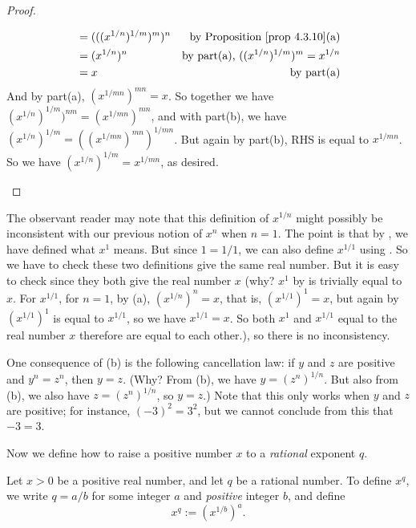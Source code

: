 \begin{proof}
\begin{enumerate}
\begin{align*}
                               & = (((x^{1/n})^{1/m})^m)^n & \text{by \PROP{4.3.10}(a)} \\
                               & = (x^{1/n})^n & \text{by part(a), \(((x^{1/n})^{1/m})^m = x^{1/n}\)} \\
                               & = x & \text{by part(a)}
    \end{align*}
    And by part(a), \((x^{1/mn})^{mn} = x\).
    So together we have \((x^{1/n})^{1/m})^{nm} = (x^{1/mn})^{mn}\),
    and with part(b), we have \((x^{1/n})^{1/m} = ((x^{1/mn})^{mn})^{1/mn}\).
    But again by part(b), RHS is equal to \(x^{1/mn}\).
    So we have \((x^{1/n})^{1/m} = x^{1/mn}\), as desired.
\end{enumerate}
\end{proof}

\begin{note}
The observant reader may note that this definition of \(x^{1/n}\) might possibly be inconsistent with our previous notion of \(x^n\) when \(n = 1\).
The point is that by , we have defined what \(x^1\) means.
But since \(1 = 1/1\), we can also define \(x^{1/1}\) using .
So we have to check these two definitions give the same real number.
But it is easy to check since they both give the real number \(x\)
(why? \(x^1\) by  is trivially equal to \(x\).
For \(x^{1/1}\), for \(n = 1\), by (a), \((x^{1/n})^n = x\), that is, \((x^{1/1})^1 = x\), but again by  \((x^{1/1})^1\) is equal to \(x^{1/1}\), so we have \(x^{1/1} = x\).
So both \(x^1\) and \(x^{1/1}\) equal to the real number \(x\) therefore are equal to each other.),
so there is no inconsistency.
\end{note}

\begin{note}
One consequence of (b) is the following cancellation law:
if \(y\) and \(z\) are positive and \(y^n = z^n\), then \(y = z\). (Why? From (b), we have \(y = (z^n)^{1/n}\). But also from (b), we also have \(z = (z^n)^{1/n}\), so \(y = z\).)
Note that this only works when \(y\) and \(z\) are positive;
for instance, \((-3)^2 = 3^2\), but we cannot conclude from this that \(-3 = 3\).
\end{note}

Now we define how to raise a positive number \(x\) to a \emph{rational} exponent \(q\).

\begin{definition} \label{def 5.6.7}
Let \(x > 0\) be a positive real number, and let \(q\) be a rational number.
To define \(x^q\), we write \(q = a/b\) for some integer \(a\) and \emph{positive} integer \(b\), and define
\[
    x^q := (x^{1/b})^a.
\]
\end{definition}

